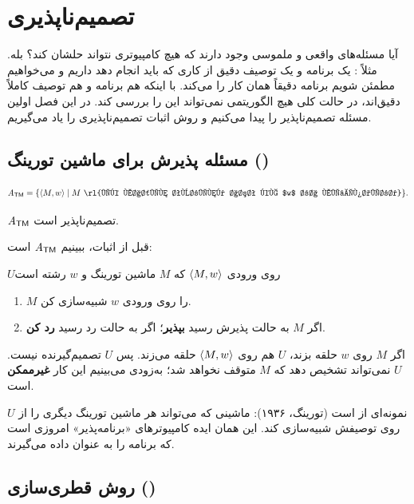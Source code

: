 \chapter{تصمیم‌ناپذیری}

آیا مسئله‌های واقعی و ملموسی وجود دارند که هیچ کامپیوتری نتواند حلشان کند؟ بله. مثلاً : یک برنامه و یک توصیف دقیق از کاری که باید انجام دهد داریم و می‌خواهیم مطمئن شویم برنامه دقیقاً همان کار را می‌کند. با اینکه هم برنامه و هم توصیف کاملاً دقیق‌اند، در حالت کلی هیچ الگوریتمی نمی‌تواند این را بررسی کند. در این فصل اولین مسئله تصمیم‌ناپذیر را پیدا می‌کنیم و روش اثبات تصمیم‌ناپذیری را یاد می‌گیریم.

\section{مسئله پذیرش برای ماشین تورینگ ()}

\[\ATM=\{\enc{M,w}\st M\ \text{\rl{یک ماشین تورینگ است که $w$ را می‌پذیرد}}\}.\]

\begin{theorem}\label{thm:atm}
$\mathit{A}_{\mathsf{TM}}$ تصمیم‌ناپذیر است.
\end{theorem}

قبل از اثبات، ببینیم $\mathit{A}_{\mathsf{TM}}$  است:
\begin{algo}{$U$}{روی ورودی $\langle M,w\rangle$ که $M$ ماشین تورینگ و $w$ رشته است}
\begin{enumerate}
\item $M$ را روی ورودی $w$ شبیه‌سازی کن.
\item اگر $M$ به حالت پذیرش رسید \textbf{بپذیر}؛ اگر به حالت رد رسید \textbf{رد کن}.
\end{enumerate}
\end{algo}
اگر $M$ روی $w$ حلقه بزند، $U$ هم روی $\langle M,w\rangle$ حلقه می‌زند. پس $U$ تصمیم‌گیرنده نیست. $U$ نمی‌تواند تشخیص دهد که $M$ متوقف نخواهد شد؛ به‌زودی می‌بینیم این کار \textbf{غیرممکن} است.

$U$ نمونه‌ای از  است (تورینگ، ۱۹۳۶): ماشینی که می‌تواند هر ماشین تورینگ دیگری را از روی توصیفش شبیه‌سازی کند. این همان ایده کامپیوترهای «برنامه‌پذیر» امروزی است که برنامه را به عنوان داده می‌گیرند.

\section{روش قطری‌سازی ()}

